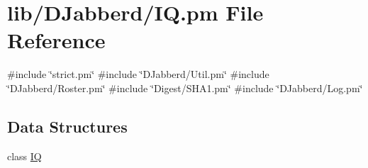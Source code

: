 \hypertarget{_i_q_8pm}{
\section{lib/\-D\-Jabberd/\-I\-Q.pm \-File \-Reference}
\label{_i_q_8pm}
}
{\ttfamily \#include \char`\"{}strict.\-pm\char`\"{}}\*
{\ttfamily \#include \char`\"{}\-D\-Jabberd/\-Util.\-pm\char`\"{}}\*
{\ttfamily \#include \char`\"{}\-D\-Jabberd/\-Roster.\-pm\char`\"{}}\*
{\ttfamily \#include \char`\"{}\-Digest/\-S\-H\-A1.\-pm\char`\"{}}\*
{\ttfamily \#include \char`\"{}\-D\-Jabberd/\-Log.\-pm\char`\"{}}\*
\subsection*{\-Data \-Structures}
\begin{DoxyCompactItemize}
\item 
class \hyperlink{class_d_jabberd_1_1_i_q}{\-I\-Q}
\end{DoxyCompactItemize}
